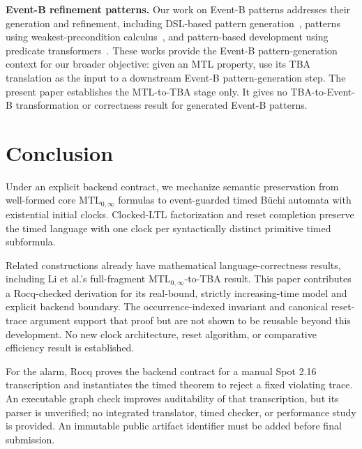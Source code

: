 \documentclass[10pt,journal,compsoc]{IEEEtran}
\newcommand{\runinhead}[1]{\par\smallskip\noindent\textbf{#1}\enspace}
\begin{document}
\runinhead{Event-B refinement patterns.}
Our work on Event-B patterns addresses their generation and refinement,
including DSL-based pattern generation~\cite{fares_abz23}, patterns using
weakest-precondition calculus~\cite{fares_facs24}, and pattern-based
development using predicate transformers~\cite{fares_scp27}. These works
provide the Event-B pattern-generation context for our broader objective:
given an MTL property, use its TBA translation as the input to a downstream
Event-B pattern-generation step. The present paper establishes the MTL-to-TBA
stage only. It gives no TBA-to-Event-B transformation or correctness result
for generated Event-B patterns.

\section{Conclusion}
Under an explicit backend contract, we mechanize semantic preservation from
well-formed core $\mathrm{MTL}_{0,\infty}$ formulas to event-guarded timed
B\"uchi automata with existential initial clocks. Clocked-LTL factorization
and reset completion preserve the timed language with one clock per
syntactically distinct primitive timed subformula.

Related constructions already have mathematical language-correctness
results, including Li et al.'s full-fragment MTL$_{0,\infty}$-to-TBA result.
This paper contributes a Rocq-checked derivation for its
real-bound, strictly increasing-time model and explicit backend boundary.
The occurrence-indexed invariant and canonical reset-trace argument support
that proof but are not shown to be reusable beyond this development. No new
clock architecture, reset algorithm, or comparative efficiency result is
established.

For the alarm, Rocq proves the backend contract for a manual Spot 2.16
transcription and instantiates the timed theorem to reject a fixed violating
trace. An executable graph check improves auditability of that transcription,
but its parser is unverified; no integrated translator, timed checker, or
performance study is provided. An immutable public artifact identifier must
be added before final submission.



\end{document}
